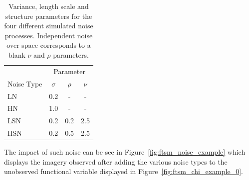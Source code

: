 \begin{table}[htbp!] 
	\caption[Parameters for simulating the noise process.]{Variance, length scale and structure parameters for the four different simulated noise processes. Independent noise over space corresponds to a blank $\nu$ and $\rho$ parameters. }
	\centering
	\label{tab:ftsm_sim_noise_params}
	\begin{tabular}{l c c  c}
		\toprule
		& \multicolumn{3}{c}{Parameter} \\ 
		Noise Type & $\sigma$ & $\rho$& $\nu$ \\
		\midrule
		LN & 0.2 & - & - \\
		HN & 1.0 & - & -\\
		LSN & 0.2 & 0.2 & 2.5 \\
		HSN & 0.2 & 0.5 & 2.5 \\
		\bottomrule
	\end{tabular}
\end{table}

The impact of such noise can be see in Figure~\ref{fig:ftsm_noise_example} which displays the imagery observed after adding the various noise types to the unobserved functional variable displayed in Figure~\ref{fig:ftsm_chi_example_0}. 

